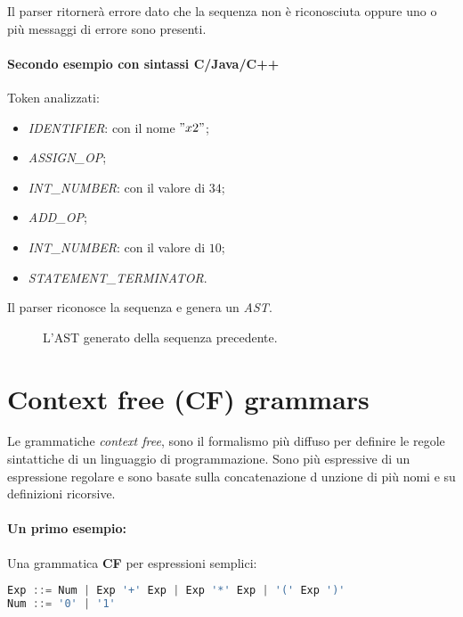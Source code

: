 Il parser ritornerà errore dato che la sequenza non è riconosciuta oppure
uno o più messaggi di errore sono presenti.


\paragraph{Secondo esempio con sintassi C/Java/C++}
Token analizzati:
\begin{itemize}
  \item \emph{IDENTIFIER}: con il nome $"x2"$;
  \item \emph{ASSIGN\_OP};
  \item \emph{INT\_NUMBER}: con il valore di $34$;
  \item \emph{ADD\_OP};
  \item \emph{INT\_NUMBER}: con il valore di $10$;
  \item \emph{STATEMENT\_TERMINATOR}.
\end{itemize}

Il parser riconosce la sequenza e genera un \emph{AST}.

\begin{figure}[ht]
    \centering
    \caption{L'AST generato della sequenza precedente.}
    \label{fig:ast-2}
\end{figure}

\section{Context free (CF) grammars}
Le grammatiche \emph{context free}, sono il formalismo più diffuso per definire
le regole sintattiche di un linguaggio di programmazione.
Sono più espressive di un espressione regolare e sono basate sulla
concatenazione d unzione di più nomi e su definizioni ricorsive.

\paragraph{Un primo esempio:}
Una grammatica \textbf{CF} per espressioni semplici:
\begin{lstlisting}[language=Java, caption={CF per espressioni semplici}]
Exp ::= Num | Exp '+' Exp | Exp '*' Exp | '(' Exp ')'
Num ::= '0' | '1'
\end{lstlisting}


